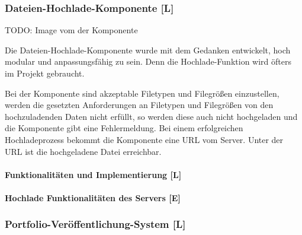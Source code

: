 \subsubsection{Dateien-Hochlade-Komponente [L]}
\label{sec:impl:contentcreation:file-Upload}

TODO: Image vom der Komponente

Die Dateien-Hochlade-Komponente wurde mit dem Gedanken entwickelt, hoch modular und anpassungsfähig zu sein. Denn die Hochlade-Funktion wird öfters im Projekt gebraucht.

Bei der Komponente sind akzeptable Filetypen und Filegrößen einzustellen, werden die gesetzten Anforderungen an Filetypen und Filegrößen von den hochzuladenden Daten nicht erfüllt, so werden diese auch nicht hochgeladen und die Komponente gibt eine Fehlermeldung.
Bei einem erfolgreichen Hochladeprozess bekommt die Komponente eine URL vom Server. Unter der URL ist die hochgeladene Datei erreichbar.

\paragraph{Funktionalitäten und Implementierung [L]}
\paragraph{Hochlade Funktionalitäten des Servers [E]}


\subsubsection{Portfolio-Veröffentlichung-System [L]}